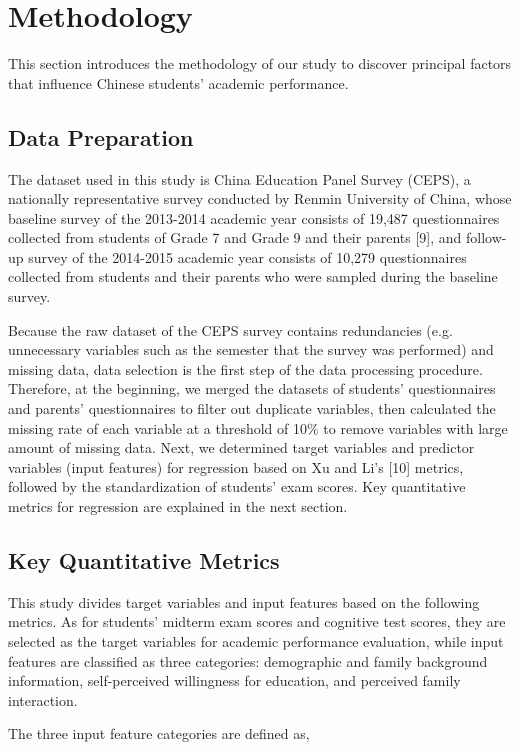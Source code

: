 \documentclass[conference]{IEEEtran}
\begin{document}
\section{Methodology}
This section introduces the methodology of our study to discover principal factors that influence Chinese students' academic performance.

\subsection{Data Preparation}
The dataset used in this study is China Education Panel Survey (CEPS), a nationally representative survey conducted by Renmin University of China, whose baseline survey of the 2013-2014 academic year consists of 19,487 questionnaires collected from students of Grade 7 and Grade 9 and their parents [9], and follow-up survey of the 2014-2015 academic year consists of 10,279 questionnaires collected from students and their parents who were sampled during the baseline survey.

Because the raw dataset of the CEPS survey contains redundancies (e.g. unnecessary variables such as the semester that the survey was performed) and missing data, data selection is the first step of the data processing procedure. Therefore, at the beginning, we merged the datasets of students' questionnaires and parents' questionnaires to filter out duplicate variables, then calculated the missing rate of each variable at a threshold of 10\% to remove variables with large amount of missing data. Next, we determined target variables and predictor variables (input features) for regression based on Xu and Li's [10] metrics, followed by the standardization of students' exam scores. Key quantitative metrics for regression are explained in the next section.

\subsection{Key Quantitative Metrics}
This study divides target variables and input features based on the following metrics. As for students' midterm exam scores and cognitive test scores, they are selected as the target variables for academic performance evaluation, while input features are classified as three categories: demographic and family background information, self-perceived willingness for education, and perceived family interaction. 

The three input feature categories are defined as,
\end{document}
